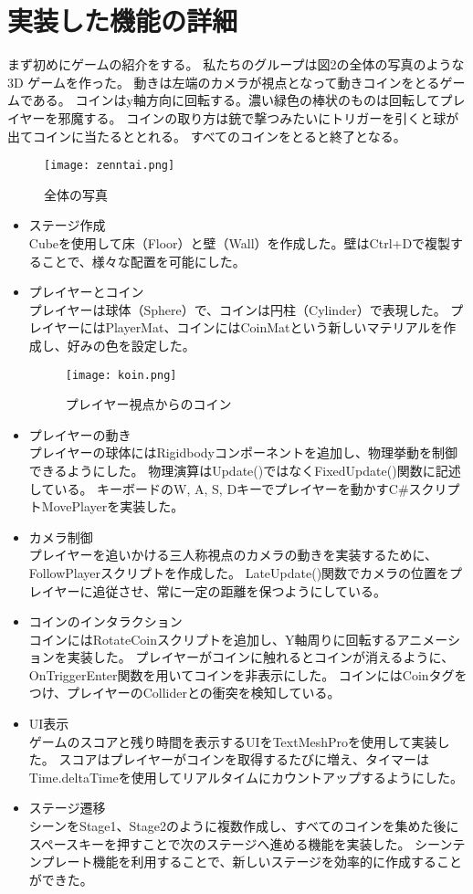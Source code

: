 \documentclass{jlreq}
\begin{document}
\section{実装した機能の詳細}
まず初めにゲームの紹介をする。
私たちのグループは図2の全体の写真のような3D ゲームを作った。
動きは左端のカメラが視点となって動きコインをとるゲームである。
コインはy軸方向に回転する。濃い緑色の棒状のものは回転してプレイヤーを邪魔する。
コインの取り方は銃で撃つみたいにトリガーを引くと球が出てコインに当たるととれる。
すべてのコインをとると終了となる。
\begin{figure}[H]
    \centering
    \texttt{[image: zenntai.png]}
    \caption{全体の写真}
    \label{fig:kadai1}
\end{figure}
\begin{itemize}
  \item ステージ作成\\
    Cubeを使用して床（Floor）と壁（Wall）を作成した。壁はCtrl+Dで複製することで、様々な配置を可能にした。
  \item プレイヤーとコイン\\
    プレイヤーは球体（Sphere）で、コインは円柱（Cylinder）で表現した。
    プレイヤーにはPlayerMat、コインにはCoinMatという新しいマテリアルを作成し、好みの色を設定した。
  \begin{figure}[H]
    \centering
    \texttt{[image: koin.png]}
    \caption{プレイヤー視点からのコイン}
    \label{fig:kadai1}
\end{figure}
  
    \item プレイヤーの動き\\
    プレイヤーの球体にはRigidbodyコンポーネントを追加し、物理挙動を制御できるようにした。
    物理演算はUpdate()ではなくFixedUpdate()関数に記述している。
    キーボードのW, A, S, Dキーでプレイヤーを動かすC\#スクリプトMovePlayerを実装した。  
  \item カメラ制御\\
    プレイヤーを追いかける三人称視点のカメラの動きを実装するために、FollowPlayerスクリプトを作成した。
    LateUpdate()関数でカメラの位置をプレイヤーに追従させ、常に一定の距離を保つようにしている。
  \item コインのインタラクション\\
    コインにはRotateCoinスクリプトを追加し、Y軸周りに回転するアニメーションを実装した。
    プレイヤーがコインに触れるとコインが消えるように、OnTriggerEnter関数を用いてコインを非表示にした。
    コインにはCoinタグをつけ、プレイヤーのColliderとの衝突を検知している。
  \item UI表示\\
    ゲームのスコアと残り時間を表示するUIをTextMeshProを使用して実装した。
    スコアはプレイヤーがコインを取得するたびに増え、タイマーはTime.deltaTimeを使用してリアルタイムにカウントアップするようにした。
  \item ステージ遷移\\
    シーンをStage1、Stage2のように複数作成し、すべてのコインを集めた後にスペースキーを押すことで次のステージへ進める機能を実装した。
    シーンテンプレート機能を利用することで、新しいステージを効率的に作成することができた。

  \end{itemize}
\end{document}
